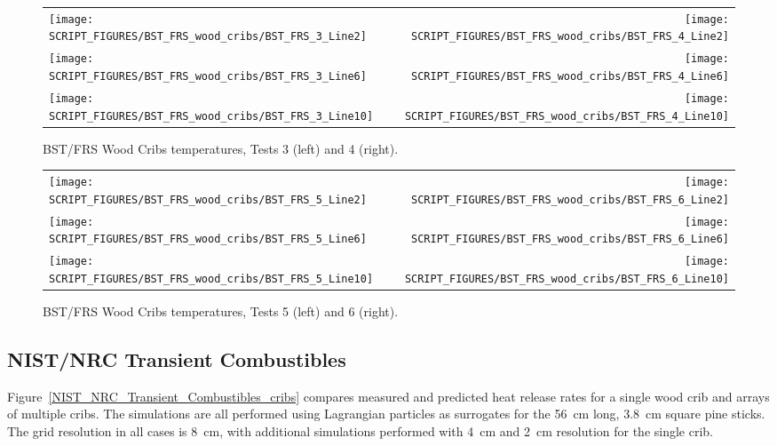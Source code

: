 \begin{figure}[p]
\begin{tabular*}{\textwidth}{l@{\extracolsep{\fill}}r}
\texttt{[image: SCRIPT\_FIGURES/BST\_FRS\_wood\_cribs/BST\_FRS\_3\_Line2]} &
\texttt{[image: SCRIPT\_FIGURES/BST\_FRS\_wood\_cribs/BST\_FRS\_4\_Line2]} \\
\texttt{[image: SCRIPT\_FIGURES/BST\_FRS\_wood\_cribs/BST\_FRS\_3\_Line6]} &
\texttt{[image: SCRIPT\_FIGURES/BST\_FRS\_wood\_cribs/BST\_FRS\_4\_Line6]} \\
\texttt{[image: SCRIPT\_FIGURES/BST\_FRS\_wood\_cribs/BST\_FRS\_3\_Line10]} &
\texttt{[image: SCRIPT\_FIGURES/BST\_FRS\_wood\_cribs/BST\_FRS\_4\_Line10]}
\end{tabular*}
\caption[BST/FRS Wood Cribs temperatures, Tests 3 and 4]{BST/FRS Wood Cribs temperatures, Tests 3 (left) and 4 (right).}
\label{BST_FRS_wood_cribs_Tests_3to4}
\end{figure}

\begin{figure}[p]
\begin{tabular*}{\textwidth}{l@{\extracolsep{\fill}}r}
\texttt{[image: SCRIPT\_FIGURES/BST\_FRS\_wood\_cribs/BST\_FRS\_5\_Line2]} &
\texttt{[image: SCRIPT\_FIGURES/BST\_FRS\_wood\_cribs/BST\_FRS\_6\_Line2]} \\
\texttt{[image: SCRIPT\_FIGURES/BST\_FRS\_wood\_cribs/BST\_FRS\_5\_Line6]} &
\texttt{[image: SCRIPT\_FIGURES/BST\_FRS\_wood\_cribs/BST\_FRS\_6\_Line6]} \\
\texttt{[image: SCRIPT\_FIGURES/BST\_FRS\_wood\_cribs/BST\_FRS\_5\_Line10]} &
\texttt{[image: SCRIPT\_FIGURES/BST\_FRS\_wood\_cribs/BST\_FRS\_6\_Line10]}
\end{tabular*}
\caption[BST/FRS Wood Cribs temperatures, Tests 5 and 6]{BST/FRS Wood Cribs temperatures, Tests 5 (left) and 6 (right).}
\label{BST_FRS_wood_cribs_Tests_5to6}
\end{figure}

\clearpage


\subsection{NIST/NRC Transient Combustibles}

Figure~\ref{NIST_NRC_Transient_Combustibles_cribs} compares measured and predicted heat release rates for a single wood crib and arrays of multiple cribs. The simulations are all performed using Lagrangian particles as surrogates for the 56~cm long, 3.8~cm square pine sticks. The grid resolution in all cases is 8~cm, with additional simulations performed with 4~cm and 2~cm resolution for the single crib.

